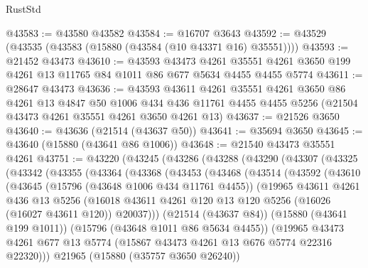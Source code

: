 \begin{lexlean}{RustStd}
\begin{coremodule}
@43583 := @43580 @43582
@43584 := @16707 @3643
@43592 := @43529 (@43535 (@43583 (@15880 (@43584 (@10 @43371 @16) @35551))))
@43593 := @21452 @43473
@43610 := @43593
    @43473
    @4261
    @35551
    @4261
    @3650
    @199
    @4261
    @13
    @11765
    @84
    @1011
    @86
    @677
    @5634
    @4455
    @4455
    @5774
@43611 := @28647 @43473
@43636 := @43593
    @43611
    @4261
    @35551
    @4261
    @3650
    @86
    @4261
    @13
    @4847
    @50
    @1006
    @434
    @436
    @11761
    @4455
    @4455
    @5256
    (@21504 @43473 @4261 @35551 @4261 @3650 @4261 @13)
@43637 := @21526 @3650
@43640 := @43636 (@21514 (@43637 @50))
@43641 := @35694 @3650
@43645 := @43640 (@15880 (@43641 @86 @1006))
@43648 := @21540 @43473 @35551 @4261
@43751 := @43220
    (@43245
      (@43286
        (@43288
          (@43290
            (@43307
              (@43325
                (@43342
                  (@43355
                    (@43364
                      (@43368
                        (@43453
                          (@43468
                            (@43514
                              (@43592
                                (@43610
                                  (@43645
                                    (@15796 (@43648 @1006 @434 @11761 @4455))
                                    (@19965
                                      @43611
                                      @4261
                                      @436
                                      @13
                                      @5256
                                      (@16018
                                        @43611
                                        @4261
                                        @120
                                        @13
                                        @120
                                        @5256
                                        (@16026 (@16027 @43611 @120))
                                        @20037)))
                                  (@21514 (@43637 @84))
                                  (@15880 (@43641 @199 @1011))
                                  (@15796 (@43648 @1011 @86 @5634 @4455))
                                  (@19965
                                    @43473
                                    @4261
                                    @677
                                    @13
                                    @5774
                                    (@15867 @43473 @4261 @13 @676 @5774 @22316 @22320)))
                                @21965
                                (@15880 (@35757 @3650 @26240))

\end{coremodule}
\end{lexlean}
